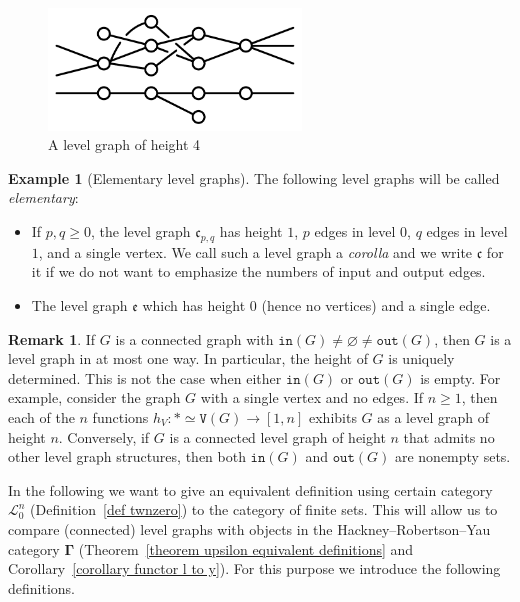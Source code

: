 \documentclass{amsart}
\numberwithin{theorem}{subsection}
\theoremstyle{definition}
\newtheorem{example}[theorem]{Example}
\newtheorem{remark}[theorem]{Remark}
\newcommand{\xfe}{\mathfrak{e}}
\newcommand{\xfc}{\mathfrak{c}}
\newcommand{\hryGamma}{\mathbf{\Gamma}}
\newcommand{\out}{\mathtt{out}}
\newcommand{\inp}{\mathtt{in}}
\newcommand{\vertex}{\mathtt{V}}
\newcommand{\scriptyell}{\mathscr L}
\begin{document}
\begin{figure}
	\includegraphics[width=0.6\textwidth]{level_graph}
	\caption{A level graph of height 4}\label{figure level graph ex}
\end{figure}

\begin{example}[Elementary level graphs]\label{example: elementary graphs}
The following level graphs will be called \emph{elementary}:
	\begin{itemize}
		\item If $p,q \geq 0$, the level graph $\xfc_{p,q}$ has height $1$, $p$ edges in level $0$, $q$ edges in level $1$, and a single vertex. We call such a level graph a \emph{corolla} and we write $\xfc$ for it if we do not want to emphasize the numbers of input and output edges.
		\item The level graph $\xfe$ which has height $0$ (hence no vertices) and a single edge.
	\end{itemize}
\end{example}

\begin{remark}
\label{remark many heights}
If $G$ is a connected graph with $\inp(G) \neq \varnothing \neq \out(G)$, then $G$ is a level graph in at most one way.
In particular, the height of $G$ is uniquely determined.
This is not the case when either $\inp(G)$ or $\out(G)$ is empty.
For example, consider the graph $G$ with a single vertex and no edges.
If $n\geq 1$, then each of the $n$ functions $h_V\colon\ast \simeq \vertex(G) \to [1,n]$ exhibits $G$ as a level graph of height $n$.
Conversely, if $G$ is a connected level graph of height $n$ that admits no other level graph structures, then both $\inp(G)$ and $\out(G)$ are nonempty sets.
\end{remark}

In the following we want to give an equivalent definition using certain category $\scriptyell_0^n$ (Definition~\ref{def twnzero}) to the category of finite sets.
This will allow us to compare (connected) level graphs with objects in the Hackney--Robertson--Yau category $\hryGamma$ (Theorem~\ref{theorem upsilon equivalent definitions} and Corollary~\ref{corollary functor l to y}).
For this purpose we introduce the following definitions.
\end{document}
